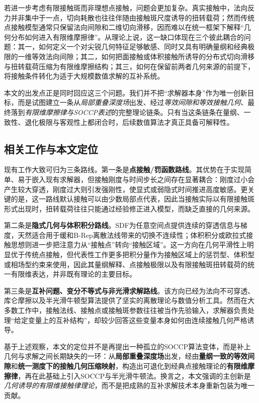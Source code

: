 ﻿\documentclass[12pt, a4paper]{ctexart}
\theoremstyle{plain}
\theoremstyle{remark}
\begin{document}
若进一步考虑有限接触斑而非理想点接触，问题会更加复杂。真实接触中，法向反力并非集中于一点，切向耗散也往往伴随由接触斑尺度诱导的扭转载荷；然而传统点接触模型通常只保留法向间隙和二维切向滑移，因而难以在统一框架下解释“几何分布如何进入有限维摩擦律”。从理论上说，这一缺口体现在三个彼此耦合的问题：其一，如何定义一个对尖锐几何特征足够敏感、同时又具有明确量纲和经典极限的一维等效法向间隙；其二，如何把面接触或体积接触所诱导的分布式切向滑移与扭转载荷压缩为有限维摩擦结构；其三，如何在保留前两者几何来源的前提下，将接触条件转化为适于大规模数值求解的互补系统。

本文的出发点正是同时回应这三个问题。我们并不把“求解器本身”作为唯一创新目标，而是试图建立一条从\emph{局部重叠深度场}出发、经过\emph{等效间隙和等效接触几何}、最终落到\emph{有限维摩擦律与SOCCP表述}的完整理论链条。只有当这条链条在量纲、一致性、退化极限与客观性上都闭合时，后续数值算法才真正具备可解释性。

\subsection{相关工作与本文定位}
现有工作大致可归为三条路线。第一条是\textbf{点接触/罚函数路线}。其优势在于实现简单、易于嵌入现有求解器，但接触刚度与时间步长之间存在显著耦合：刚度过小会产生较大穿透，刚度过大则引发强刚性，使显式或弱隐式时间推进高度敏感\cite{hunek1993penalty,kolman2021bipenalty}。更关键的是，这一路线默认接触可以由少数局部点代表，因此当接触实际以有限接触斑形式出现时，扭转载荷往往只能通过经验修正进入模型，而缺乏直接的几何来源。

第二条是\textbf{隐式几何与体积积分路线}。SDF为任意空间点提供连续的穿透信息与梯度，天然适合用于缓和B-Rep离散法线带来的切换不连续性；体积积分或欧拉式接触思想则进一步把注意力从“接触点”转向“接触区域”。这一方向在几何平滑性上明显优于传统点接触，但代表性工作更多把积分量作为接触区域上的惩罚型、体积型或相场型约束来使用，因此其量纲解释、点接触极限以及有限接触斑扭转载荷的统一有限维表达，并非既有理论的主要目标\cite{leichner2019implicit,lorez2024eulerian}。

第三条是\textbf{互补问题、变分不等式与非光滑求解路线}。该方向已经为法向不可穿透、库仑摩擦以及半光滑牛顿型算法提供了坚实的离散理论与数值分析工具。然而在大多数工作中，接触法线、接触点或接触斑参数往往被当作先验输入，求解器负责处理“给定变量上的互补结构”，却较少回答这些变量本身如何由连续接触几何严格诱导。

基于上述观察，本文的定位并不是再提出一种孤立的SOCCP算法变体，而是补上几何与求解之间长期缺失的一环：从\textbf{局部重叠深度场}出发，经由\textbf{量纲一致的等效间隙}和\textbf{统一测度下的接触几何压缩映射}，构造出可退化到经典点接触理论的\textbf{有限维摩擦律}，再在此基础上引入SOCCP与半光滑牛顿法。换言之，本文强调的主创新是\emph{几何诱导的有限维接触律理论}，而不是把成熟的互补求解技术本身重新包装为唯一贡献。
\end{document}
